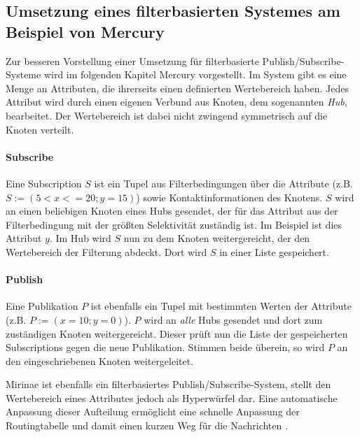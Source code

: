 \subsection[Umsetzung eines filterbasierten Systemes]{Umsetzung eines filterbasierten Systemes am Beispiel von Mercury}
\label{chap:related:mercury}
Zur besseren Vorstellung einer Umsetzung für filterbasierte Publish/Subscribe-Systeme wird im folgenden Kapitel Mercury vorgestellt. Im System gibt es eine Menge an Attributen, die ihrerseits einen definierten Wertebereich haben. Jedes Attribut wird durch einen eigenen Verbund aus Knoten, dem sogenannten \emph{Hub}, bearbeitet. Der Wertebereich ist dabei nicht zwingend symmetrisch auf die Knoten verteilt.

\paragraph{Subscribe}
Eine Subscription $S$ ist ein Tupel aus Filterbedingungen über die Attribute (z.B. $S := (5 < x <= 20; y = 15)$) sowie Kontaktinformationen des Knotens. $S$ wird an einen beliebigen Knoten eines Hubs gesendet, der für das Attribut aus der Filterbedingung mit der größten Selektivität zuständig ist. Im Beispiel ist dies Attribut $y$. Im Hub wird $S$ nun zu dem Knoten weitergereicht, der den Wertebereich der Filterung abdeckt. Dort wird $S$ in einer Liste gespeichert.

\paragraph{Publish}
Eine Publikation $P$ ist ebenfalls ein Tupel mit bestimmten Werten der Attribute (z.B. $P := (x = 10; y = 0)$). $P$ wird an \emph{alle} Hubs gesendet und dort zum zuständigen Knoten weitergereicht. Dieser prüft nun die Liste der gespeicherten Subscriptions gegen die neue Publikation. Stimmen beide überein, so wird $P$ an den eingeschriebenen Knoten weitergeleitet.

Mirinae ist ebenfalls ein filterbasiertes Publish/Subscribe-System, stellt den Wertebereich eines Attributes jedoch als Hyperwürfel dar. Eine automatische Anpassung dieser Aufteilung ermöglicht eine schnelle Anpassung der Routingtabelle und damit einen kurzen Weg für die Nachrichten \cite{Choi2005Mirinae}.
